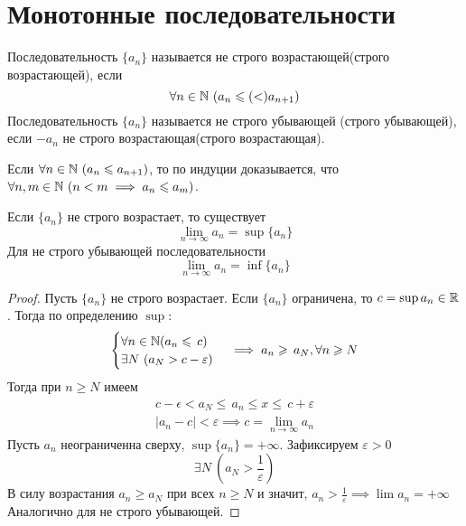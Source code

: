 \section{Монотонные последовательности}
\begin{definition}
    Последовательность $ \{a_n\} $ называется не строго возрастающей(строго возрастающей), если \begin{equation}
        \forall n \in \mathbb{N} \ (a_n \leqslant( <) a_{n + 1})
    \end{equation}
    Последовательность $ \{a_n\} $ называется не строго убывающей (строго убывающей), если $ - a_n $ не строго возрастающая(строго возрастающая).
\end{definition}
\begin{note}
    Если $ \forall  n \in \mathbb{N}\ (a_n \leqslant  a_{n + 1}) $, то по индуции доказывается, что $ \forall  n, m \in \mathbb{N}\ (n < m \implies  a_n \leqslant  a_m) $.
\end{note}
\begin{theorem} 
    Если $ \{a_n\} $ не строго возрастает, то существует \[ \lim_{n \to \infty}a_n = \sup\{a_n\} \]
    Для не строго убывающей последовательности \[ \lim_{n \to \infty}a_n = \inf\{a_n\} \]
\end{theorem}
\begin{proof}
    Пусть $ \{a_n\} $ не строго возрастает. Если $ \{a_n\} $ ограничена, то $ c = \sup{a_n} \in  \mathbb{R} $. Тогда по определению $ \sup $: \begin{gather} \begin{cases}
        \forall n \in \mathbb{N} (a_n \leqslant\, c) \\
        \exists N \ (a_N > c - \varepsilon)
    \end{cases} \implies a_n \geqslant\, a_N, \forall n \geqslant N
    \end{gather}
    Тогда при $ n \geq  N $ имеем \begin{gather}
        c - \epsilon < a_N \leq\, a_n \leq x \leq\, c + \varepsilon \\
        |a_n - c | < \varepsilon \implies c = \lim_{n \to \infty} a_n
    \end{gather}
    Пусть $ a_n $ неограниченна сверху, $ \sup\{a_n\} = + \infty $. Зафиксируем $ \varepsilon > 0 $ \begin{equation}
        \exists N \ (a_N > \frac{1}{\varepsilon})
    \end{equation} В силу возрастания $ a_n \geq a_N $ при всех $ n \geq  N $ и значит, $ a_n > \frac{1}{\varepsilon}  \implies  \lim a_n = + \infty$
    Аналогично для не строго убывающей.
\end{proof}

